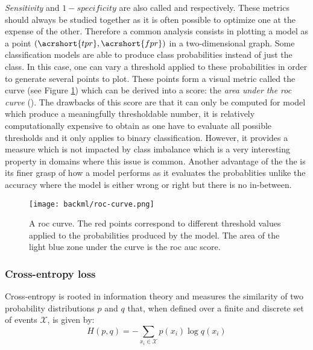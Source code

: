 \textit{Sensitivity} and $1 - \textit{specificity}$ are also called  and  respectively. These metrics should always be studied together as it is often possible to optimize one at the expense of the other. Therefore a common analysis consists in plotting a model as a point $(\acrshort{tpr}, \acrshort{fpr})$ in a two-dimensional graph. Some classification models are able to produce class probabilities instead of just the class. In this case, one can vary a threshold applied to these probabilities in order to generate several points to plot. These points form a visual metric called the  curve (see Figure \ref{fig:backml:roc-curve}) which can be derived into a score:  the \textit{area under the \acrshort{roc} curve} (\rocauc). The drawbacks of this score are that it can only be computed for model which produce a meaningfully thresholdable number, it is relatively computationally expensive to obtain as one have to evaluate all possible thresholds and it only applies to binary classification. However, it provides a measure which is not impacted by class imbalance which is a very interesting property in domains where this issue is common. Another advantage of the the \rocaucs is its finer grasp of how a model performs as it evaluates the probablities unlike the accuracy where the model is either wrong or right but there is no in-between.

\begin{figure}
  \centering
  \texttt{[image: backml/roc-curve.png]}
  \caption{A \acrshort{roc} curve. The red points correspond to different threshold values applied to the probabilities produced by the model. The area of the light blue zone under the curve is the \acrshort{roc} \acrshort{auc} score.}
  \label{fig:backml:roc-curve}
\end{figure}


\subsubsection{Cross-entropy loss}
\label{sssec:backml:metric:crossentropy}

Cross-entropy is rooted in information theory and measures the similarity of two probability distributions $p$ and $q$ that, when defined over a finite and discrete set of events $\mathcal{X}$, is given by:
\begin{equation}
\label{eqn:backml:crossentropy}
H(p, q) = - \sum\limits_{x_i \in \mathcal{X}} p\left(x_i\right) \log q\left(x_i\right)
\end{equation}

